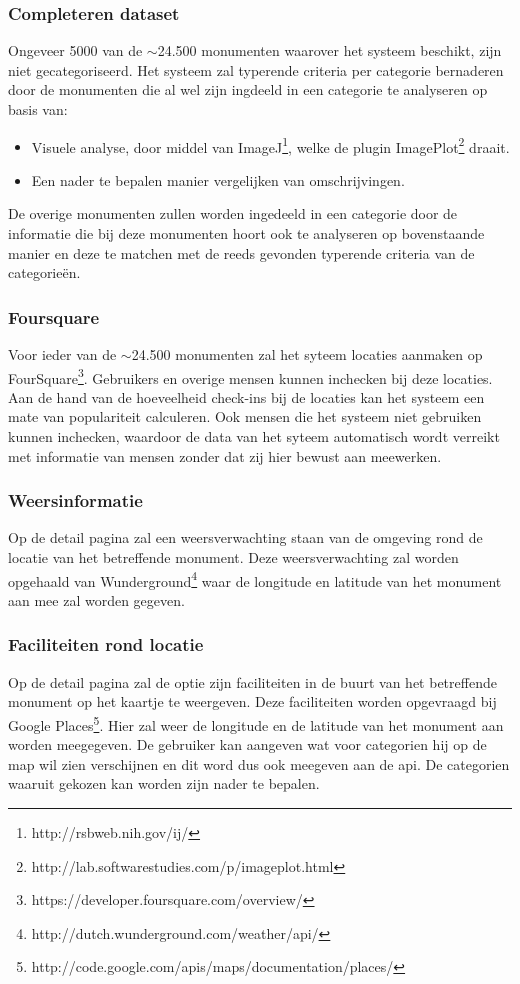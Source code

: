 \documentclass[a4paper,10pt]{article}
\begin{document}
			\subsubsection{Completeren dataset}
			Ongeveer 5000 van de $\sim$24.500 monumenten waarover het systeem beschikt, zijn niet gecategoriseerd. Het systeem zal typerende criteria per categorie bernaderen door de monumenten die al wel zijn ingdeeld in een categorie te analyseren op basis van:
				\begin{itemize}
					\item Visuele analyse, door middel van ImageJ\footnote{http://rsbweb.nih.gov/ij/}, welke de plugin ImagePlot\footnote{http://lab.softwarestudies.com/p/imageplot.html} draait.
					\item Een nader te bepalen manier vergelijken van omschrijvingen.
				\end{itemize}
			De overige monumenten zullen worden ingedeeld in een categorie door de informatie die bij deze monumenten hoort ook te analyseren op bovenstaande manier en deze te matchen met de reeds gevonden typerende criteria van de categorie\"en.
	
	        \subsubsection{Foursquare}
			Voor ieder van de $\sim$24.500 monumenten zal het syteem locaties aanmaken op FourSquare\footnote{https://developer.foursquare.com/overview/}. Gebruikers en overige mensen kunnen inchecken bij deze locaties. Aan de hand van de hoeveelheid check-ins bij de locaties kan het systeem een mate van populariteit calculeren. Ook mensen die het systeem niet gebruiken kunnen inchecken, waardoor de data van het syteem automatisch wordt verreikt met informatie van mensen zonder dat zij hier bewust aan meewerken.
				
			\subsubsection{Weersinformatie}
			Op de detail pagina zal een weersverwachting staan van de omgeving rond de locatie van het betreffende monument. Deze weersverwachting zal worden opgehaald van Wunderground\footnote{http://dutch.wunderground.com/weather/api/} waar de longitude en latitude van het monument aan mee zal worden gegeven.
				
			\subsubsection{Faciliteiten rond locatie}
			Op de detail pagina zal de optie zijn faciliteiten in de buurt van het betreffende monument op het kaartje te weergeven. Deze faciliteiten worden opgevraagd bij Google Places\footnote{http://code.google.com/apis/maps/documentation/places/}. Hier zal weer de longitude en de latitude van het monument aan worden meegegeven. De gebruiker kan aangeven wat voor categorien hij op de map wil zien verschijnen en dit word dus ook meegeven aan de api. De categorien waaruit gekozen kan worden zijn nader te bepalen.
				
\end{document}
